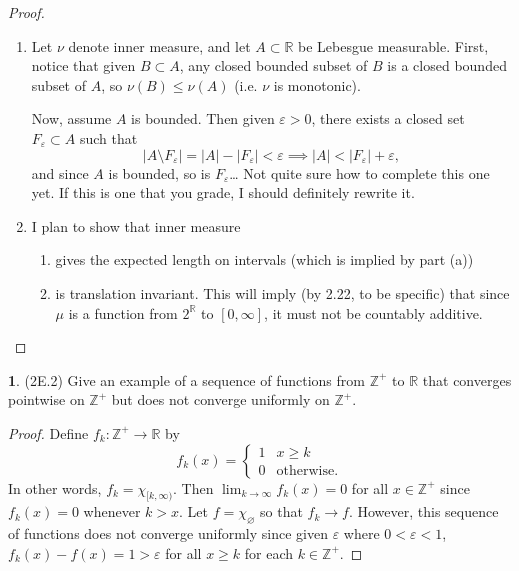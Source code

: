 \documentclass[12pt]{article}
\theoremstyle{definition}
\newtheorem{ex}{}
\begin{document}
\begin{proof}\
	\begin{enumerate}[label=(\alph*)]
		\item Let $\nu$ denote inner measure, and let $A \subset \mathbb{R}$ be Lebesgue measurable.
		      First, notice that given $B \subset A$, any closed bounded subset of $B$ is a closed bounded subset of $A$, so $\nu(B) \leq \nu(A)$ (i.e. $\nu$ is monotonic).


		      Now, assume $A$ is bounded.
		      Then given $\varepsilon > 0$, there exists a closed set $F_\varepsilon \subset A$ such that \begin{equation*}
			      |A \setminus F_\varepsilon| = |A| - |F_\varepsilon| < \varepsilon \implies |A| < |F_\varepsilon| + \varepsilon,
		      \end{equation*} and since $A$ is bounded, so is $F_\varepsilon$\dots
		      Not quite sure how to complete this one yet.
		      If this is one that you grade, I should definitely rewrite it.
		\item I plan to show that inner measure \begin{enumerate}[label=(\roman*)]
			      \item gives the expected length on intervals (which is implied by part (a))
			      \item is translation invariant.
              This will imply (by 2.22, to be specific) that since $\mu$ is a function from $2^\mathbb{R}$ to $[0, \infty]$, it must not be countably additive.
		      \end{enumerate}
	\end{enumerate}
\end{proof}

\begin{ex}
	(2E.2)
	Give an example of a sequence of functions from $\mathbb{Z}^+$ to $\mathbb{R}$ that converges pointwise on $\mathbb{Z}^+$ but does not converge uniformly on $\mathbb{Z}^+$.
\end{ex}
\begin{proof}
	Define $f_k : \mathbb{Z}^+ \to \mathbb{R}$ by \begin{equation*}
		f_k(x) = \begin{cases}
			1 & x \geq k          \\
			0 & \text{otherwise}.
		\end{cases}
	\end{equation*}
	In other words, $f_k = \chi_{[k, \infty)}$.
	Then $\lim_{k \to \infty}f_k(x) = 0$ for all $x \in \mathbb{Z}^+$ since $f_k(x) = 0$ whenever $k > x$.
	Let $f = \chi_\varnothing$ so that $f_k \to f$.
	However, this sequence of functions does not converge uniformly since given $\varepsilon$ where $0 < \varepsilon < 1$, $f_k(x) - f(x) = 1 > \varepsilon$ for all $x \geq k$ for each $k \in \mathbb{Z}^+$.

\end{proof}
\end{document}
